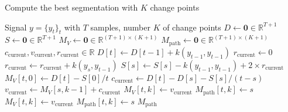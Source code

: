\documentclass[12pt]{article}
\newcommand\RR{\mathbb{R}}
\begin{document}
\begin{algorithm}
    \small
    \caption{Compute the best segmentation with $K$ change points}
    \label{alg:dynp} %
    \begin{algorithmic} %
        \REQUIRE Signal $y = \{y_t\}_t$ with $T$ samples, number $K$ of change points
        \STATE {}
        \STATE $D \gets \bm{0}\in\mathbb{R}^{T+1}$ 
        \STATE $S \gets \bm{0}\in\mathbb{R}^{T+1}$ 
        \STATE $M_V \gets \bm{0}\in\mathbb{R}^{(T+1)\times (K+1)}$ 
        \STATE $M_{\text{path}} \gets \bm{0}\in\mathbb{R}^{(T+1)\times (K+1)}$ 
        \STATE $c_{\text{current}}, v_{\text{current}}, r_{\text{current}}\in\RR$ 
        \STATE
        \STATE {}
        \STATE
        \STATE {}
        \STATE $D[t] \gets D[t-1] + k(y_{t-1}, y_{t-1})$ 
        \STATE
        \STATE {}
        \STATE $r_{\text{current}}\gets0$
        \STATE $r_{\text{current}} \gets r_{\text{current}} + k(y_{s}, y_{t-1})$ 
        \STATE $S[s] \gets S[s] - k(y_{t-1}, y_{t-1}) + 2\times r_{\text{current}}$ 
        \ENDFOR
        \STATE
        \STATE {}
        \STATE $M_{V}[t, 0] \gets D[t] - S[0]/t$ 
        \STATE $c_{\text{current}} \gets D[t]-D[s] - S[s]/(t-s)$ 
        \STATE $v_{\text{current}} \gets M_V[s, k-1] + c_{\text{current}}$ 
        \STATE $M_V[t, k] \gets v_{\text{current}}$
        \STATE $M_{\text{path}}[t, k] \gets s$
        \ELSE
        \STATE $M_V[t, k] \gets v_{\text{current}}$
        \STATE $M_{\text{path}}[t, k] \gets s$
        \ENDIF
        \ENDIF
        \ENDFOR
        \ENDFOR
        \ENDFOR
        \RETURN $M_{\text{path}}$
    \end{algorithmic}
\end{algorithm}
\end{document}
